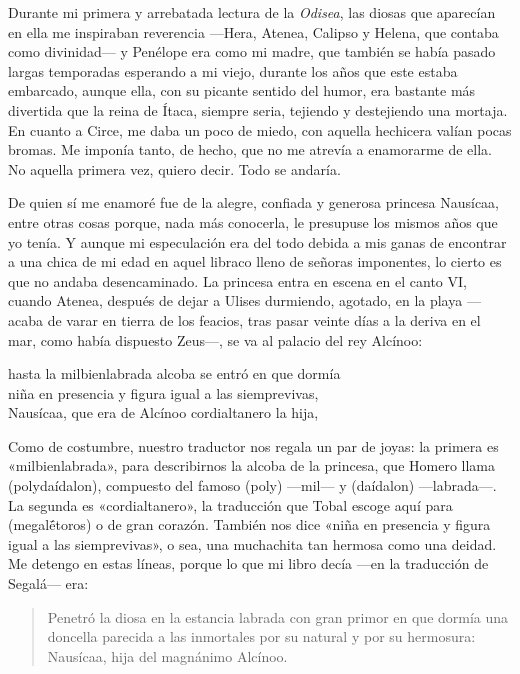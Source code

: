 \label{cap:nausicaa}

Durante mi primera y arrebatada lectura de la \emph{Odisea}, las diosas que aparecían en ella me inspiraban reverencia ---Hera, Atenea, Calipso y Helena, que contaba como divinidad--- y Penélope era como mi madre, que también se había pasado largas temporadas esperando a mi viejo, durante los años que este estaba embarcado, aunque ella, con su picante sentido del humor, era bastante más divertida que la reina de Ítaca, siempre seria, tejiendo y destejiendo una mortaja. En cuanto a Circe, me daba un poco de miedo, con aquella hechicera valían pocas bromas.
Me imponía tanto, de hecho, que no me atrevía a enamorarme de ella. No aquella primera vez, quiero decir. Todo se andaría.

De quien sí me enamoré fue de la alegre, confiada y generosa princesa Nausícaa, entre otras cosas porque, nada más conocerla, le presupuse los mismos años que yo tenía. Y aunque mi especulación era del todo debida a mis ganas de encontrar a una chica de mi edad en aquel libraco lleno de señoras imponentes, lo cierto es que no andaba desencaminado. La princesa entra en escena en el canto VI, cuando Atenea, después de dejar a Ulises durmiendo, agotado, en la playa ---acaba de varar en tierra de los feacios, tras pasar veinte días a la deriva en el mar, como había dispuesto Zeus---, se va al palacio del rey Alcínoo:

\begin{versocita}
hasta la milbienlabrada alcoba se entró en que dormía\\
niña en presencia y figura igual a las siemprevivas,\\
Nausícaa, que era de Alcínoo cordialtanero la hija,
\end{versocita}

Como de costumbre, nuestro traductor nos regala un par de joyas: la primera es «milbienlabrada», para describirnos la alcoba de la princesa, que Homero llama  (polydaídalon), compuesto del famoso  (poly) ---mil--- y  (daídalon) ---labrada---. La segunda es «cordialtanero», la traducción que Tobal escoge aquí para  (megalḗtoros) o de gran corazón. También nos dice «niña en presencia y figura igual a las siemprevivas», o sea, una muchachita tan hermosa como una deidad. Me detengo en estas líneas, porque lo que mi libro decía ---en la traducción de Segalá--- era:

\begin{quote}
Penetró la diosa en la estancia labrada con gran primor en que dormía una doncella parecida a las inmortales por su natural y por su hermosura: Nausícaa, hija del magnánimo Alcínoo.
\end{quote}

